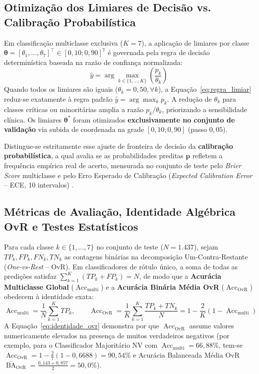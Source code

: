 \documentclass[12pt,a4paper]{article}
\begin{document}
\subsection{Otimização dos Limiares de Decisão vs. Calibração Probabilística}
Em classificação multiclasse exclusiva ($K=7$), a aplicação de limiares por classe $\boldsymbol{\theta} = [\theta_1, \dots, \theta_7]^\top \in [0{,}10; 0{,}90]^7$ é governada pela regra de decisão determinística baseada na razão de confiança normalizada:
\begin{equation}
    \hat{y} = \arg\max_{k \in \{1, \dots, K\}} \left( \frac{p_k}{\theta_k} \right)
    \label{eq:regra_limiar}
\end{equation}
Quando todos os limiares são iguais ($\theta_k = 0{,}50, \forall k$), a Equação~\eqref{eq:regra_limiar} reduz-se exatamente à regra padrão $\hat{y} = \arg\max_k p_k$. A redução de $\theta_k$ para classes críticas ou minoritárias amplia a razão $p_k / \theta_k$, priorizando a sensibilidade clínica. Os limiares $\boldsymbol{\theta}^*$ foram otimizados \textbf{exclusivamente no conjunto de validação} via subida de coordenada na grade $[0{,}10; 0{,}90]$ (passo $0{,}05$).

Distingue-se estritamente esse ajuste de fronteira de decisão da \textbf{calibração probabilística}, a qual avalia se as probabilidades preditas $\mathbf{p}$ refletem a frequência empírica real de acerto, mensurada no conjunto de teste pelo \textit{Brier Score} multiclasse \cite{brier1950} e pelo Erro Esperado de Calibração (\textit{Expected Calibration Error} -- ECE, 10 intervalos) \cite{guo2017}.

\subsection{Métricas de Avaliação, Identidade Algébrica OvR e Testes Estatísticos}
Para cada classe $k \in \{1, \dots, 7\}$ no conjunto de teste ($N = 1.437$), sejam $TP_k, FP_k, FN_k, TN_k$ as contagens binárias na decomposição Um-Contra-Restante (\textit{One-vs-Rest} -- OvR). Em classificadores de rótulo único, a soma de todas as predições satisfaz $\sum_{k=1}^K (TP_k + FP_k) = N$, de modo que a \textbf{Acurácia Multiclasse Global} ($\operatorname{Acc}_{\text{multi}}$) e a \textbf{Acurácia Binária Média OvR} ($\operatorname{Acc}_{\text{OvR}}$) obedecem à identidade exata:
\begin{equation}
    \operatorname{Acc}_{\text{multi}} = \frac{1}{N}\sum_{k=1}^{K} TP_k, \qquad
    \operatorname{Acc}_{\text{OvR}} = \frac{1}{K}\sum_{k=1}^{K} \frac{TP_k + TN_k}{N} = 1 - \frac{2}{K}\left(1 - \operatorname{Acc}_{\text{multi}}\right)
    \label{eq:identidade_ovr}
\end{equation}
A Equação~\eqref{eq:identidade_ovr} demonstra por que $\operatorname{Acc}_{\text{OvR}}$ assume valores numericamente elevados na presença de muitos verdadeiros negativos (por exemplo, para o Classificador Majoritário NV com $\operatorname{Acc}_{\text{multi}} = 66{,}88\%$, tem-se $\operatorname{Acc}_{\text{OvR}} = 1 - \frac{2}{7}(1 - 0{,}6688) = 90{,}54\%$ e Acurácia Balanceada Média OvR $\overline{\operatorname{BA}}_{\text{OvR}} = \frac{0{,}143 + 0{,}857}{2} = 50{,}0\%$).
\end{document}
